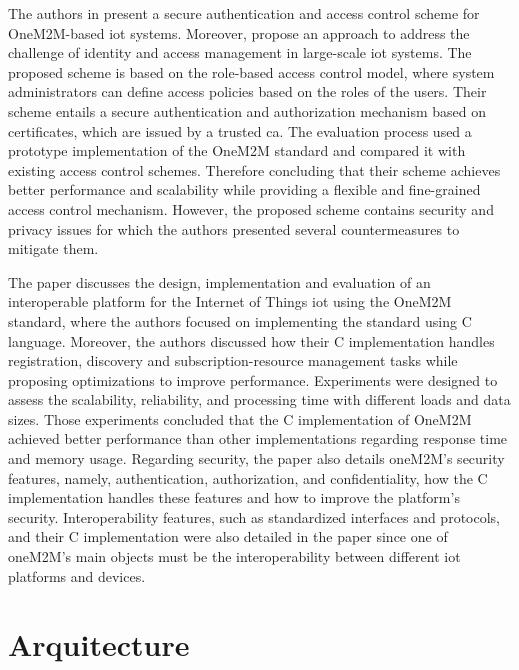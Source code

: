 \documentclass[a4paper,fleqn]{cas-dc}
\begin{document}
The authors in \cite{Benoygopal2021} present a secure authentication and access control scheme for OneM2M-based \gls{iot} systems. Moreover, propose an approach to address the challenge of identity and access management in large-scale \gls{iot} systems. The proposed scheme is based on the role-based access control model, where system administrators can define access policies based on the roles of the users. Their scheme entails a secure authentication and authorization mechanism based on certificates, which are issued by a trusted \gls{ca}. The evaluation process used a prototype implementation of the OneM2M standard and compared it with existing access control schemes. Therefore concluding that their scheme achieves better performance and scalability while providing a flexible and fine-grained access control mechanism. However, the proposed scheme contains security and privacy issues for which the authors presented several countermeasures to mitigate them.

The paper \cite{Kim2018} discusses the design, implementation and evaluation of an interoperable platform for the Internet of Things \gls{iot} using the OneM2M standard, where the authors focused on implementing the standard using C language. Moreover, the authors discussed how their C implementation handles registration, discovery and subscription-resource management tasks while proposing optimizations to improve performance. Experiments were designed to assess the scalability, reliability, and processing time with different loads and data sizes. Those experiments concluded that the C implementation of OneM2M achieved better performance than other implementations regarding response time and memory usage. Regarding security, the paper also details oneM2M's security features, namely, authentication, authorization, and confidentiality, how the C implementation handles these features and how to improve the platform's security. Interoperability features, such as standardized interfaces and protocols, and their C implementation were also detailed in the paper since one of oneM2M's main objects must be the interoperability between different \gls{iot} platforms and devices.



\section{Arquitecture}
\label{architecture}
\end{document}
